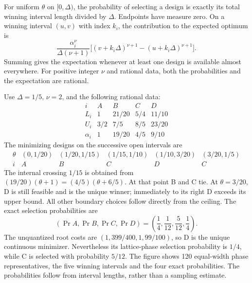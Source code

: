 \documentclass[11pt,a4paper]{article}
\begin{document}
For uniform $\theta$ on $[0,\Delta)$, the probability of selecting a
design is exactly its total winning interval length divided by $\Delta$.
Endpoints have measure zero. On a winning interval $(u,v)$ with index
$k_i$, the contribution to the expected optimum is
\begin{equation}\label{eq:phaseexpectation}
 \frac{\alpha_i^\nu}{\Delta(\nu+1)}
 \bigl[(v+k_i\Delta)^{\nu+1}-(u+k_i\Delta)^{\nu+1}\bigr].
\end{equation}
Summing gives the expectation whenever at least one design is available
almost everywhere. For positive integer $\nu$ and rational data, both
the probabilities and the expectation are rational.

\begin{example}\label{ex:phase}
Use $\Delta=1/5$, $\nu=2$, and the following rational data:
\[
\begin{array}{c|cccc}
 i&A&B&C&D\\\hline
 L_i&1&21/20&5/4&11/10\\
 U_i&3/2&7/5&8/5&23/20\\
 \alpha_i&1&19/20&4/5&9/10
\end{array}
\]
The minimizing designs on the successive open intervals are
\[
\begin{array}{c|ccccc}
 \theta&(0,1/20)&(1/20,1/15)&(1/15,1/10)&(1/10,3/20)&(3/20,1/5)\\\hline
 i&A&B&C&D&C
\end{array}
\]
The internal crossing $1/15$ is obtained from
$(19/20)(\theta+1)=(4/5)(\theta+6/5)$.
At that point B and C tie. At $\theta=3/20$, D is still feasible and
is the unique winner; immediately to its right D exceeds its upper bound.
All other boundary choices follow directly from the ceiling.
The exact selection probabilities are
\begin{equation}\label{eq:probabilities}
 (\Pr A,\Pr B,\Pr C,\Pr D)
 =\left(\frac14,\frac1{12},\frac5{12},\frac14\right).
\end{equation}
The unquantized root costs are $(1,399/400,1,99/100)$, so D is the unique
continuous minimizer. Nevertheless its lattice-phase selection probability
is $1/4$, while C is selected with probability $5/12$.
The figure shows 120 equal-width phase representatives, the five winning
intervals and the four exact probabilities. The probabilities follow from
interval lengths, rather than a sampling estimate.
\end{example}
\end{document}
